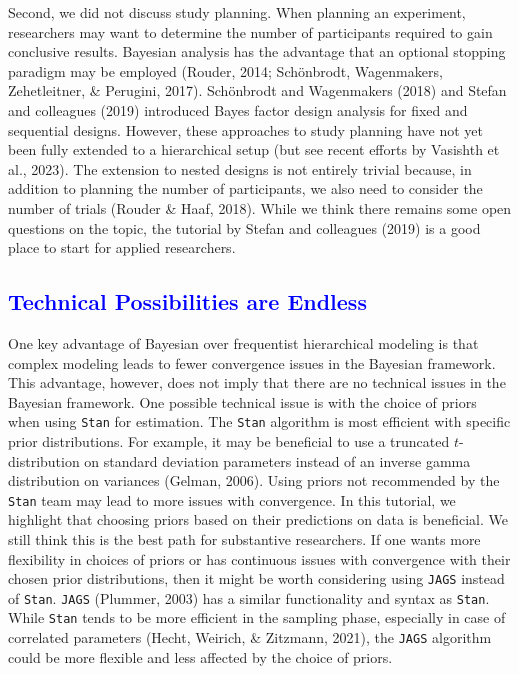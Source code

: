 \documentclass[
  english,
  doc,floatsintext]{apa6}
\begin{document}
Second, we did not discuss study planning. When planning an experiment, researchers may want to determine the number of participants required to gain conclusive results. Bayesian analysis has the advantage that an optional stopping paradigm may be employed (Rouder, 2014; Schönbrodt, Wagenmakers, Zehetleitner, \& Perugini, 2017). Schönbrodt and Wagenmakers (2018) and Stefan and colleagues (2019) introduced Bayes factor design analysis for fixed and sequential designs. However, these approaches to study planning have not yet been fully extended to a hierarchical setup (but see recent efforts by Vasishth et al., 2023). The extension to nested designs is not entirely trivial because, in addition to planning the number of participants, we also need to consider the number of trials (Rouder \& Haaf, 2018). While we think there remains some open questions on the topic, the tutorial by Stefan and colleagues (2019) is a good place to start for applied researchers.

\hypertarget{section-1}{%
\subsection{\texorpdfstring{\textcolor{blue}{Technical Possibilities are Endless}}{}}\label{section-1}}

One key advantage of Bayesian over frequentist hierarchical modeling is that complex modeling leads to fewer convergence issues in the Bayesian framework. This advantage, however, does not imply that there are no technical issues in the Bayesian framework. One possible technical issue is with the choice of priors when using \texttt{Stan} for estimation. The \texttt{Stan} algorithm is most efficient with specific prior distributions. For example, it may be beneficial to use a truncated \(t\)-distribution on standard deviation parameters instead of an inverse gamma distribution on variances (Gelman, 2006). Using priors not recommended by the \texttt{Stan} team may lead to more issues with convergence. In this tutorial, we highlight that choosing priors based on their predictions on data is beneficial. We still think this is the best path for substantive researchers. If one wants more flexibility in choices of priors or has continuous issues with convergence with their chosen prior distributions, then it might be worth considering using \texttt{JAGS} instead of \texttt{Stan}. \texttt{JAGS} (Plummer, 2003) has a similar functionality and syntax as \texttt{Stan}. While \texttt{Stan} tends to be more efficient in the sampling phase, especially in case of correlated parameters (Hecht, Weirich, \& Zitzmann, 2021), the \texttt{JAGS} algorithm could be more flexible and less affected by the choice of priors.
\end{document}
